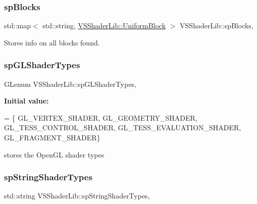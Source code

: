 \subsubsection{\texorpdfstring{sp\+Blocks}{spBlocks}}
{\footnotesize\ttfamily std\+::map$<$ std\+::string, \hyperlink{class_v_s_shader_lib_1_1_uniform_block}{V\+S\+Shader\+Lib\+::\+Uniform\+Block} $>$ V\+S\+Shader\+Lib\+::sp\+Blocks\hspace{0.3cm}{\ttfamily [static]}, {\ttfamily [protected]}}



Stores info on all blocks found. 

\mbox{\label{class_v_s_shader_lib_af7466a4cd23698356bb9447ab46802ba}} 
\subsubsection{\texorpdfstring{sp\+G\+L\+Shader\+Types}{spGLShaderTypes}}
{\footnotesize\ttfamily G\+Lenum V\+S\+Shader\+Lib\+::sp\+G\+L\+Shader\+Types\hspace{0.3cm}{\ttfamily [static]}, {\ttfamily [protected]}}

{\bfseries Initial value\+:}
\begin{DoxyCode}
= \{
        GL\_VERTEX\_SHADER,
        GL\_GEOMETRY\_SHADER,
        GL\_TESS\_CONTROL\_SHADER,
        GL\_TESS\_EVALUATION\_SHADER,
        GL\_FRAGMENT\_SHADER\}
\end{DoxyCode}


stores the Open\+GL shader types 

\mbox{\label{class_v_s_shader_lib_adc3642d9640776a69f60d8a050aace90}} 
\subsubsection{\texorpdfstring{sp\+String\+Shader\+Types}{spStringShaderTypes}}
{\footnotesize\ttfamily std\+::string V\+S\+Shader\+Lib\+::sp\+String\+Shader\+Types\hspace{0.3cm}{\ttfamily [static]}, {\ttfamily [protected]}}

